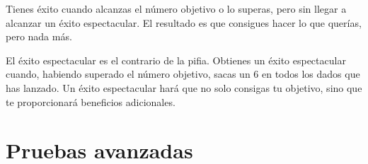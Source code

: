Tienes éxito cuando alcanzas el número objetivo o lo superas, pero sin llegar a alcanzar un éxito espectacular. El resultado es que consigues hacer lo que querías, pero nada más.



El éxito espectacular es el contrario de la pifia. Obtienes un éxito espectacular cuando, habiendo superado el número objetivo, sacas un 6 en todos los dados que has lanzado. Un éxito espectacular hará que no solo consigas tu objetivo, sino que te proporcionará beneficios adicionales.



\section{Pruebas avanzadas}








